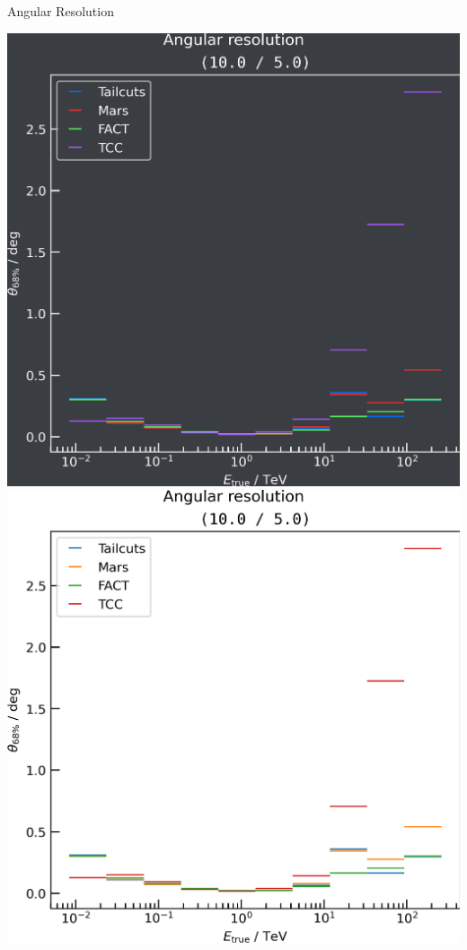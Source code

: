 \begin{frame}{Angular Resolution}
\begin{minipage}{0.32\textwidth}
    \fi
  \end{minipage}
  \begin{minipage}{0.32\textwidth}
    \ifdefined\darktheme
      \centering
      \includegraphics[width=\textwidth]{plots/ang_res/ang_res_10.0_5.0_dark.png}
    \else
      \centering
      \includegraphics[width=\textwidth]{plots/ang_res/ang_res_10.0_5.0_light.png}
    \fi
  \end{minipage}
\end{frame}

